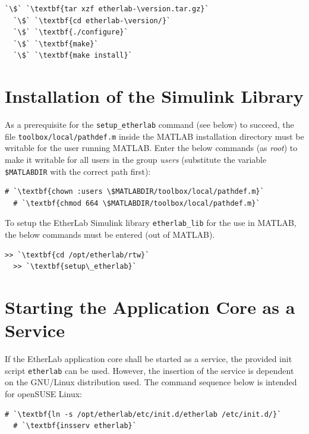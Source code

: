 \begin{lstlisting}[gobble=2]
  `\$` `\textbf{tar xzf etherlab-\version.tar.gz}`
  `\$` `\textbf{cd etherlab-\version/}`
  `\$` `\textbf{./configure}`
  `\$` `\textbf{make}`
  `\$` `\textbf{make install}`
\end{lstlisting}


\section{Installation of the Simulink Library}
\label{sec:inst-blockset}

As a prerequisite for the \texttt{setup\_etherlab} command (see below) to
succeed, the file \texttt{toolbox/local/pathdef.m} inside the MATLAB
installation directory must be writable for the user running MATLAB. Enter the
below commands (as \textit{root}) to make it writable for all users in the
group \textit{users} (substitute the variable \texttt{\$MATLABDIR} with the
correct path first):

\begin{lstlisting}[gobble=2]
  # `\textbf{chown :users \$MATLABDIR/toolbox/local/pathdef.m}`
  # `\textbf{chmod 664 \$MATLABDIR/toolbox/local/pathdef.m}`
\end{lstlisting}

To setup the EtherLab Simulink library \texttt{etherlab\_lib} for the use in
MATLAB, the below commands must be entered (out of MATLAB).

\begin{lstlisting}[gobble=2]
  >> `\textbf{cd /opt/etherlab/rtw}`
  >> `\textbf{setup\_etherlab}`
\end{lstlisting}


\section{Starting the Application Core as a Service}
\label{sec:service}

If the EtherLab application core shall be started as a service, the provided
init script \lstinline+etherlab+ can be used. However, the insertion of the
service is dependent on the GNU/Linux distribution used. The command sequence
below is intended for openSUSE Linux:

\begin{lstlisting}[gobble=2]
  # `\textbf{ln -s /opt/etherlab/etc/init.d/etherlab /etc/init.d/}`
  # `\textbf{insserv etherlab}`
\end{lstlisting}


